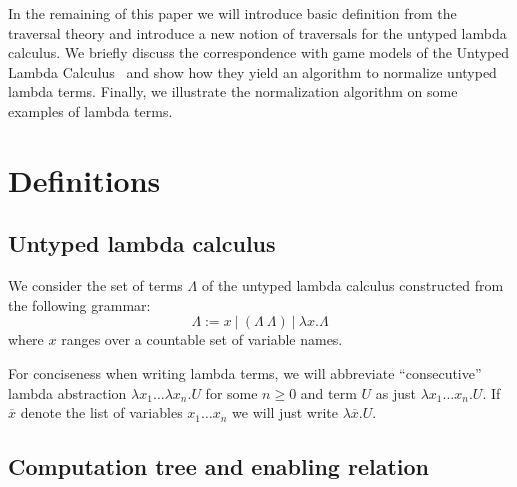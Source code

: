 \documentclass{article}
\theoremstyle{definition}
\begin{document}
In the remaining of this paper we will introduce basic definition from the traversal theory and introduce a new notion of traversals for the untyped lambda calculus. We briefly discuss the correspondence with game models of the Untyped Lambda Calculus~\cite{KerThesis} and show how they yield an algorithm to normalize untyped lambda terms. Finally, we illustrate the normalization algorithm on some examples of lambda terms.

\section{Definitions}

\subsection{Untyped lambda calculus}

We consider the set of terms $\Lambda$ of the untyped lambda calculus constructed from the following grammar:
$$\Lambda := x\ |\ (\Lambda\ \Lambda)\ |\ \lambda x. \Lambda $$
where $x$ ranges over a countable set of variable names.

For conciseness when writing lambda terms, we will abbreviate ``consecutive'' lambda abstraction $\lambda x_1 \ldots \lambda x_n . U$ for some $n\geq 0$ and term $U$ as just
$\lambda x_1 \ldots x_n . U$. If $\overline{x}$ denote the list of variables $x_1 \ldots x_n$ we will just write $\lambda \overline{x} . U$.

\subsection{Computation tree and enabling relation}
\end{document}
